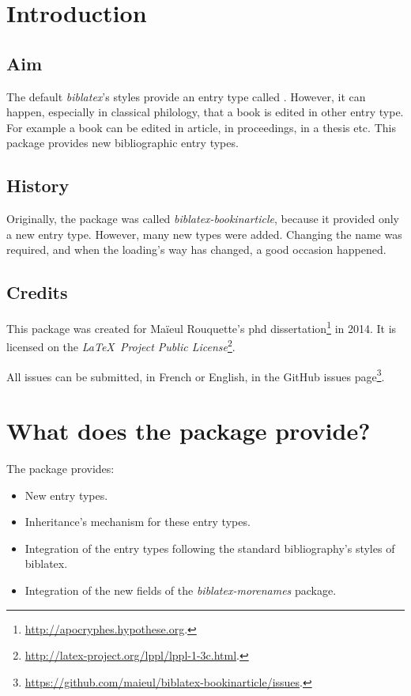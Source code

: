 \documentclass{ltxdockit}[2011/03/25]
\newcommand{\biblatex}{\emph{biblatex}\xspace}
\begin{document}
\printtitlepage
\tableofcontents

\section{Introduction}

\subsection{Aim}
The default \biblatex's styles provide an entry type called . 
However, it can happen, especially in classical philology, that a book is edited in other entry type. 
For example a book can be edited in article, in proceedings, in a thesis etc.
This package provides new bibliographic entry types.

\subsection{History}

Originally, the package was called \emph{biblatex-bookinarticle}, because it provided only a new  entry type. 
However, many new types were added. 
Changing the name was required, and when the loading's way has changed, a good occasion happened.
\subsection{Credits}

This package was created for Maïeul Rouquette's phd dissertation\footnote{\url{http://apocryphes.hypothese.org}.} in 2014. It is licensed on the \emph{\LaTeX\ Project Public License}\footnote{\url{http://latex-project.org/lppl/lppl-1-3c.html}.}. 


All issues can be submitted, in French or English, in the GitHub issues page\footnote{\url{https://github.com/maieul/biblatex-bookinarticle/issues}.}.


\section{What does the package provide?}

The package provides:
\begin{itemize}
  \item New entry types. 
  \item Inheritance's mechanism for these entry types. 
  \item Integration of the entry types following the standard bibliography's styles of biblatex. 
  \item Integration of the new fields of the \emph{biblatex-morenames} package.
\end{itemize}
\end{document}
